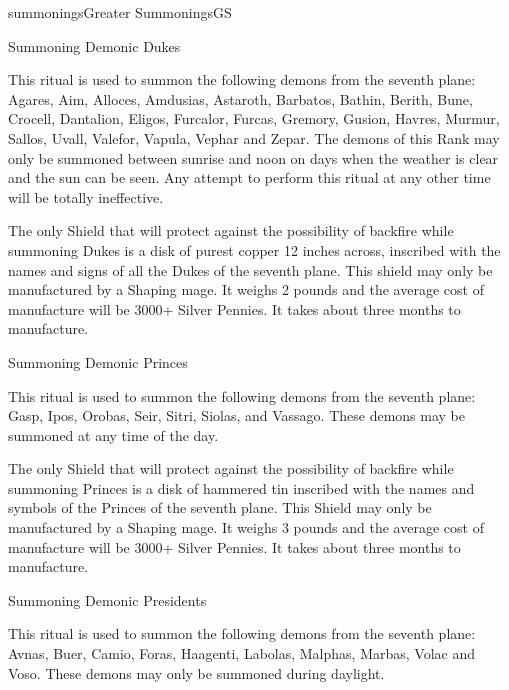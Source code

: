 \begin{College}[1.0]{summonings}{Greater Summonings}{GS}
\begin{ritual}[R-1]{Summoning Demonic Dukes}

\begin{effects}
This ritual is used to summon the following demons from the seventh
plane: Agares, Aim, Alloces, Amdusias, Astaroth, Barbatos, Bathin,
Berith, Bune, Crocell, Dantalion, Eligos, Furcalor, Furcas, Gremory,
Gusion, Havres, Murmur, Sallos, Uvall, Valefor, Vapula, Vephar and
Zepar.  The demons of this Rank may only be summoned between sunrise
and noon on days when the weather is clear and the sun can be seen.
Any attempt to perform this ritual at any other time will be totally
ineffective.

The only Shield that will protect against the possibility of backfire
while summoning Dukes is a disk of purest copper 12 inches across,
inscribed with the names and signs of all the Dukes of the seventh
plane.  This shield may only be manufactured by a Shaping mage.  It
weighs 2 pounds and the average cost of manufacture will be 3000+
Silver Pennies. It takes about three months to manufacture.
\end{effects}
\end{ritual}

\begin{ritual}[R-2]{Summoning Demonic Princes}

\begin{effects}
This ritual is used to summon the following demons from the seventh
plane: Gasp, Ipos, Orobas, Seir, Sitri, Siolas, and Vassago.  These
demons may be summoned at any time of the day.

The only Shield that will protect against the possibility of backfire
while summoning Princes is a disk of hammered tin inscribed with the
names and symbols of the Princes of the seventh plane.  This Shield
may only be manufactured by a Shaping mage.  It weighs 3 pounds and
the average cost of manufacture will be 3000+ Silver Pennies. It takes
about three months to manufacture.
\end{effects}
\end{ritual}

\begin{ritual}[R-3]{Summoning Demonic Presidents}

\begin{effects}
This ritual is used to summon the following demons from the seventh
plane: Avnas, Buer, Camio, Foras, Haagenti, Labolas, Malphas, Marbas,
Volac and Voso.  These demons may only be summoned during daylight.


\end{effects}
\end{ritual}
\end{College}
